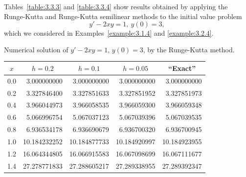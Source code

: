 \setcounter{example}{3}
\begin{example}
  \label{example:3.3.4} \rm Tables~\ref{table:3.3.3} and \ref{table:3.3.4} show results obtained by
  applying the Runge-Kutta and Runge-Kutta semilinear methods to the initial value problem
  \[
    y'-2xy=1,\ y(0)=3,
  \]
  which we considered in Examples~\ref{example:3.1.4} and \ref{example:3.2.4}.
\end{example}
\setcounter{table}{2}
\begin{examplesolution}
\begin{newtable}
  \label{table:3.3.3} Numerical solution of $y'-2xy=1$, $y(0)=3$, by the Runge-Kutta method.
  \begin{center}
    \begin{tabular}{|c|r|r|r|r|}
      \hline
      \multicolumn{1}{|c|}{$x$} & \multicolumn{1}{|c|}{$h=0.2$} & \multicolumn{1}{|c|}{$h=0.1$} & \multicolumn{1}{|c|}{$h=0.05$} & \multicolumn{1}{|c|}{``Exact''} \\
      \hline
      0.0                       & 3.000000000                   & 3.000000000                   & 3.000000000                    & 3.000000000                     \\
      0.2                       & 3.327846400                   & 3.327851633                   & 3.327851952                    & 3.327851973                     \\
      0.4                       & 3.966044973                   & 3.966058535                   & 3.966059300                    & 3.966059348                     \\
      0.6                       & 5.066996754                   & 5.067037123                   & 5.067039396                    & 5.067039535                     \\
      0.8                       & 6.936534178                   & 6.936690679                   & 6.936700320                    & 6.936700945                     \\
      1.0                       & 10.184232252                  & 10.184877733                  & 10.184920997                   & 10.184923955                    \\
      1.2                       & 16.064344805                  & 16.066915583                  & 16.067098699                   & 16.067111677                    \\
      1.4                       & 27.278771833                  & 27.288605217                  & 27.289338955                   & 27.289392347                    \\

\end{tabular}
\end{center}
\end{newtable}
\end{examplesolution}
